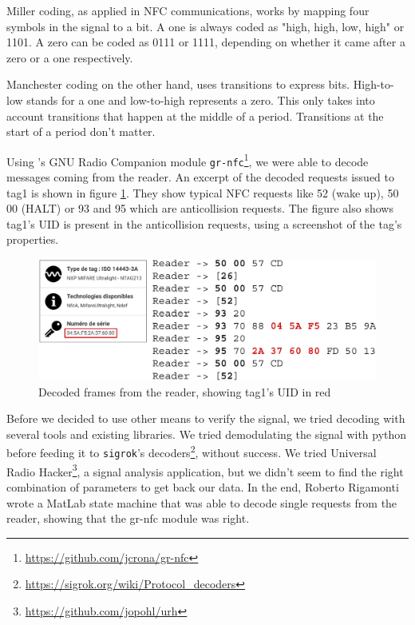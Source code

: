 Miller coding, as applied in NFC communications, works by mapping four symbols in the signal to a bit. A one is always coded as "high, high, low, high" or 1101. A zero can be coded as 0111 or 1111, depending on whether it came after a zero or a one respectively. \cite{phy_nfc_coding}

Manchester coding on the other hand, uses transitions to express bits. High-to-low stands for a one and low-to-high represents a zero. This only takes into account transitions that happen at the middle of a period. Transitions at the start of a period don't matter. \cite{phy_nfc_coding, wiki_manchester_2019}

Using \textcite{rona_sniffing_2017}'s GNU Radio Companion module \texttt{gr-nfc}\footnote{\url{https://github.com/jcrona/gr-nfc}}, we were able to decode messages coming from the reader. An excerpt of the decoded requests issued to tag1 is shown in figure \ref{fig:decoded}. They show typical NFC requests like 52 (wake up), 50 00 (HALT) or 93 and 95 which are anticollision requests. The figure also shows tag1's UID is present in the anticollision requests, using a screenshot of the tag's properties.

\begin{figure}[htbp!]
  \centering
  \includegraphics[scale=0.35]{figures/data_decoded-frames_app.png}
  \caption{Decoded frames from the reader, showing tag1's UID in red}
  \label{fig:decoded}
\end{figure}

Before we decided to use other means to verify the signal, we tried decoding with several tools and existing libraries. We tried demodulating the signal with python before feeding it to \texttt{sigrok}'s decoders\footnote{\url{https://sigrok.org/wiki/Protocol_decoders}}, without success. We tried Universal Radio Hacker\footnote{\url{https://github.com/jopohl/urh}}, a signal analysis application, but we didn't seem to find the right combination of parameters to get back our data. In the end, Roberto Rigamonti wrote a MatLab state machine that was able to decode single requests from the reader, showing that the gr-nfc module was right.

